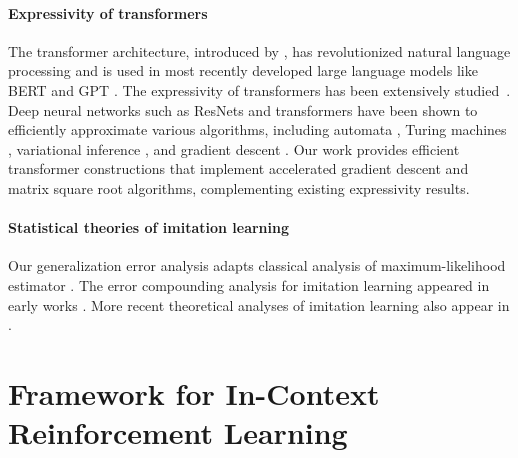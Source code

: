 \documentclass[10pt]{article}
\newcommand{\<}{\left\langle}
\renewcommand{\>}{\right\rangle}
\begin{document}
\paragraph{Expressivity of transformers} The transformer architecture, introduced by \cite{vaswani2017attention}, has revolutionized natural language processing and is used in most recently developed large language models like BERT and GPT \citep{devlin2018bert, brown2020language}. The expressivity of transformers has been extensively studied~\citep{yun2019transformers, perez2019turing, hron2020infinite,yao2021self, bhattamishra2020computational, zhang2022unveiling, liu2022transformers, wei2022statistically, fu2023can, bai2023transformers, akyurek2022learning, von2023transformers}. Deep neural networks such as ResNets and transformers have been shown to efficiently approximate various algorithms, including automata \citep{liu2022transformers}, Turing machines \citep{wei2022statistically}, variational inference \citep{mei2023deep}, and gradient descent \citep{bai2023transformers, akyurek2022learning, von2023transformers}. Our work provides efficient transformer constructions that implement accelerated gradient descent and matrix square root algorithms, complementing existing expressivity results.





\paragraph{Statistical theories of imitation learning} Our generalization error analysis adapts classical analysis of maximum-likelihood estimator \citep{geer2000empirical}. The error compounding analysis for imitation learning appeared in early works \citep{ross2011reduction, ross2010efficient}. More recent theoretical analyses of imitation learning also appear in \cite{rajaraman2020toward, rajaraman2021provably, rashidinejad2021bridging}.

















\section{Framework for In-Context Reinforcement Learning}\label{sec:framework}
\end{document}
